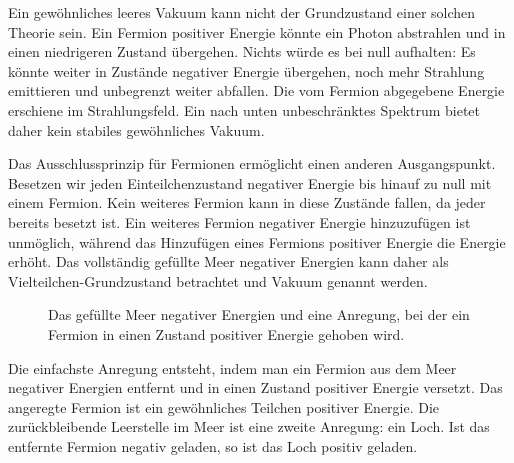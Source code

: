 Ein gewöhnliches leeres Vakuum kann nicht der Grundzustand einer solchen Theorie sein. Ein Fermion positiver Energie könnte ein Photon abstrahlen und in einen niedrigeren Zustand übergehen. Nichts würde es bei null aufhalten: Es könnte weiter in Zustände negativer Energie übergehen, noch mehr Strahlung emittieren und unbegrenzt weiter abfallen. Die vom Fermion abgegebene Energie erschiene im Strahlungsfeld. Ein nach unten unbeschränktes Spektrum bietet daher kein stabiles gewöhnliches Vakuum.

Das Ausschlussprinzip für Fermionen ermöglicht einen anderen Ausgangspunkt. Besetzen wir jeden Einteilchenzustand negativer Energie bis hinauf zu null mit einem Fermion. Kein weiteres Fermion kann in diese Zustände fallen, da jeder bereits besetzt ist. Ein weiteres Fermion negativer Energie hinzuzufügen ist unmöglich, während das Hinzufügen eines Fermions positiver Energie die Energie erhöht. Das vollständig gefüllte Meer negativer Energien kann daher als Vielteilchen-Grundzustand betrachtet und Vakuum genannt werden.

\begin{figure}
\centering
{}
\caption{Das gefüllte Meer negativer Energien und eine Anregung, bei der ein Fermion in einen Zustand positiver Energie gehoben wird.}
\end{figure}

Die einfachste Anregung entsteht, indem man ein Fermion aus dem Meer negativer Energien entfernt und in einen Zustand positiver Energie versetzt. Das angeregte Fermion ist ein gewöhnliches Teilchen positiver Energie. Die zurückbleibende Leerstelle im Meer ist eine zweite Anregung: ein Loch. Ist das entfernte Fermion negativ geladen, so ist das Loch positiv geladen.

